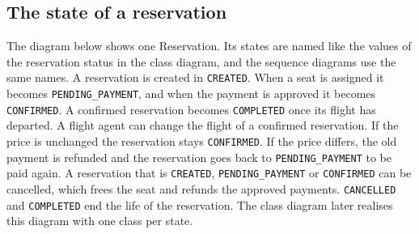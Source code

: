 
\subsection*{The state of a reservation}

The diagram below shows one Reservation. Its states are named like the values
of the reservation status in the class diagram, and the sequence diagrams use
the same names. A reservation is created in \texttt{CREATED}. When a seat is
assigned it becomes \texttt{PENDING\_PAYMENT}, and when the payment is approved
it becomes \texttt{CONFIRMED}. A confirmed reservation becomes
\texttt{COMPLETED} once its flight has departed. A flight agent can change the
flight of a confirmed reservation. If the price is unchanged the reservation
stays \texttt{CONFIRMED}. If the price differs, the old payment is refunded and
the reservation goes back to \texttt{PENDING\_PAYMENT} to be paid again. A
reservation that is \texttt{CREATED}, \texttt{PENDING\_PAYMENT} or
\texttt{CONFIRMED} can be cancelled, which frees the seat and refunds the
approved payments. \texttt{CANCELLED} and \texttt{COMPLETED} end the life of
the reservation. The class diagram later realises this diagram with one class
per state.

